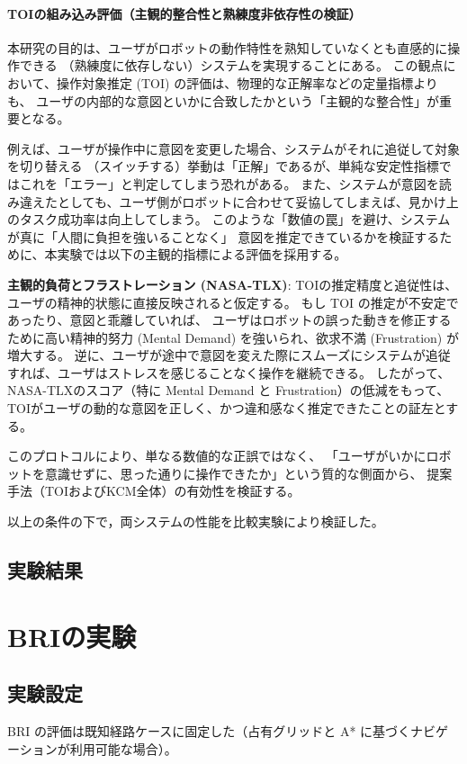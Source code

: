 \documentclass[../../main.tex]{subfiles} %
\begin{document}
\paragraph{TOIの組み込み評価（主観的整合性と熟練度非依存性の検証）}
本研究の目的は、ユーザがロボットの動作特性を熟知していなくとも直感的に操作できる
（熟練度に依存しない）システムを実現することにある。
この観点において、操作対象推定 (TOI) の評価は、物理的な正解率などの定量指標よりも、
ユーザの内部的な意図といかに合致したかという「主観的な整合性」が重要となる。

例えば、ユーザが操作中に意図を変更した場合、システムがそれに追従して対象を切り替える
（スイッチする）挙動は「正解」であるが、単純な安定性指標ではこれを「エラー」と判定してしまう恐れがある。
また、システムが意図を読み違えたとしても、ユーザ側がロボットに合わせて妥協してしまえば、見かけ上のタスク成功率は向上してしまう。
このような「数値の罠」を避け、システムが真に「人間に負担を強いることなく」
意図を推定できているかを検証するために、本実験では以下の主観的指標による評価を採用する。

\textbf{主観的負荷とフラストレーション (NASA-TLX)}: 
TOIの推定精度と追従性は、ユーザの精神的状態に直接反映されると仮定する。
もし TOI の推定が不安定であったり、意図と乖離していれば、
ユーザはロボットの誤った動きを修正するために高い精神的努力 (Mental Demand) を強いられ、欲求不満 (Frustration) が増大する。
逆に、ユーザが途中で意図を変えた際にスムーズにシステムが追従すれば、ユーザはストレスを感じることなく操作を継続できる。
したがって、NASA-TLXのスコア（特に Mental Demand と Frustration）の低減をもって、
TOIがユーザの動的な意図を正しく、かつ違和感なく推定できたことの証左とする。

このプロトコルにより、単なる数値的な正誤ではなく、
「ユーザがいかにロボットを意識せずに、思った通りに操作できたか」という質的な側面から、
提案手法（TOIおよびKCM全体）の有効性を検証する。

以上の条件の下で，両システムの性能を比較実験により検証した。

\subsection{実験結果}





\section{BRIの実験}
\subsection{実験設定}
BRI の評価は既知経路ケースに固定した（占有グリッドと A* に基づくナビゲーションが利用可能な場合）。
\end{document}
